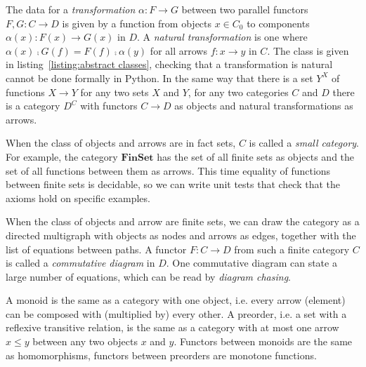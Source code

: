 The data for a \emph{transformation} $\alpha : F \to G$ between two parallel functors $F, G : C \to D$ is given by a function from objects $x \in C_0$ to components $\alpha(x) : F(x) \to G(x)$ in $D$.
A \emph{natural transformation} is one where $\alpha(x) \fcmp G(f) = F(f) \fcmp \alpha(y)$ for all arrows $f : x \to y$ in $C$.
The  class is given in listing~\ref{listing:abstract classes}, checking that a transformation is natural cannot be done formally in Python.
In the same way that there is a set $Y^X$ of functions $X \to Y$ for any two sets $X$ and $Y$, for any two categories $C$ and $D$ there is a category $D^C$ with functors $C \to D$ as objects and natural transformations as arrows.

\begin{example}
When the class of objects and arrows are in fact sets, $C$ is called a \emph{small category}.
For example, the category $\mathbf{FinSet}$ has the set of all finite sets as objects and the set of all functions between them as arrows.
This time equality of functions between finite sets is decidable, so we can write unit tests that check that the axioms hold on specific examples.
\end{example}

\begin{example}
When the class of objects and arrow are finite sets, we can draw the category as a directed multigraph with objects as nodes and arrows as edges, together with the list of equations between paths.
A functor $F : C \to D$ from such a finite category $C$ is called a \emph{commutative diagram} in $D$.
One commutative diagram can state a large number of equations, which can be read by \emph{diagram chasing}.
\end{example}

\begin{example}
A monoid is the same as a category with one object, i.e. every arrow (element) can be composed with (multiplied by) every other.
A preorder, i.e. a set with a reflexive transitive relation, is the same as a category with at most one arrow $x \leq y$ between any two objects $x$ and $y$.
Functors between monoids are the same as homomorphisms, functors between preorders are monotone functions.
\end{example}


